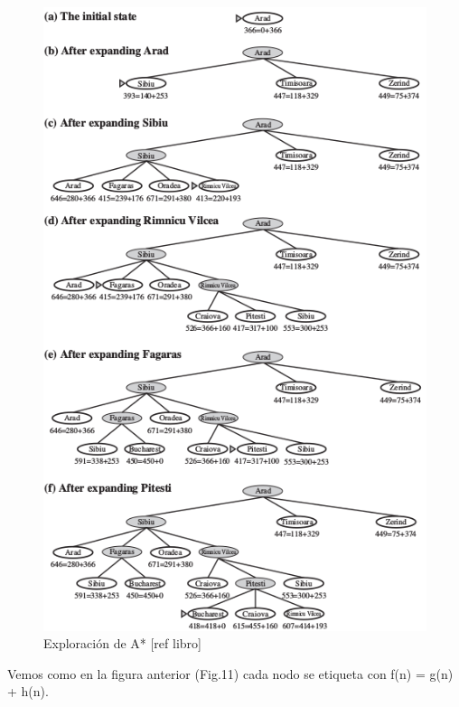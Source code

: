 \documentclass[conference]{IEEEtran}
\begin{document}
{\begin{figure}[H]
\centerline{\includegraphics[scale=0.4505]{IMAGENES/A*.png}}
\caption{Exploración de A* [ref libro]}
\label{fig}
\end{figure}

Vemos como en la figura anterior (Fig.11) cada nodo se etiqueta con f(n) = g(n) + h(n).


}
\end{document}

